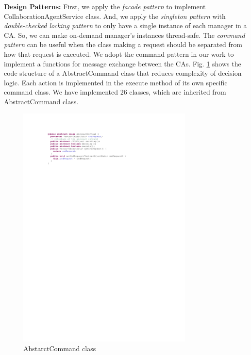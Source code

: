 \documentclass[conference]{IEEEtran}
\begin{document}
\noindent
\textbf{Design Patterns:}  First, we apply the \textit{facade pattern} to implement {\small \sffamily CollaborationAgentService} class.  And, we apply the \textit{singleton pattern} with \textit{double-checked locking pattern} to only have a single instance of each manager in a CA. So, we can make on-demand manager's instances thread-safe. The \textit{command pattern} can be useful when the class making a request should be separated from how that request is executed.  We adopt the command pattern in our work to implement a functions for message exchange  between the CAs. 
Fig. \ref{fig:abstractcommands} shows the code structure of a {\small \sffamily AbstractCommand} class that reduces complexity of decision logic. Each action is implemented in the {\small \sffamily execute} method of its own specific command class. We have implemented 26 classes, which are inherited from {\small \sffamily AbstractCommand} class.
 \begin{figure}[htb]
\centering
\includegraphics[width=8.8cm,keepaspectratio]{abstractcommand}
\caption{AbstarctCommand class}
\label{fig:abstractcommands}
\end{figure}
\end{document}
